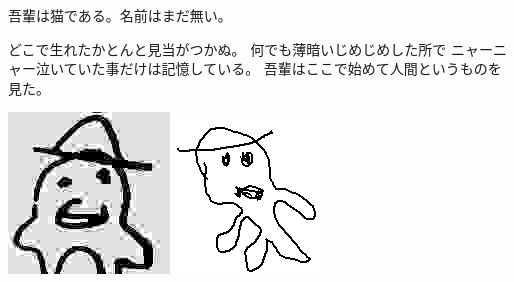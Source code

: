 \documentclass{jarticle}
\begin{document}
吾輩は猫である。名前はまだ無い。

どこで生れたかとんと見当がつかぬ。
何でも薄暗いじめじめした所で
ニャーニャー泣いていた事だけは記憶している。
吾輩はここで始めて人間というものを見た。

\includegraphics[clip,keepaspectratio,width=1.0\linewidth]{img/pokutuna.jpg}
\includegraphics[clip,keepaspectratio,width=1.0\linewidth]{img/pokutuna_by_hitode909.png}
\end{document}
